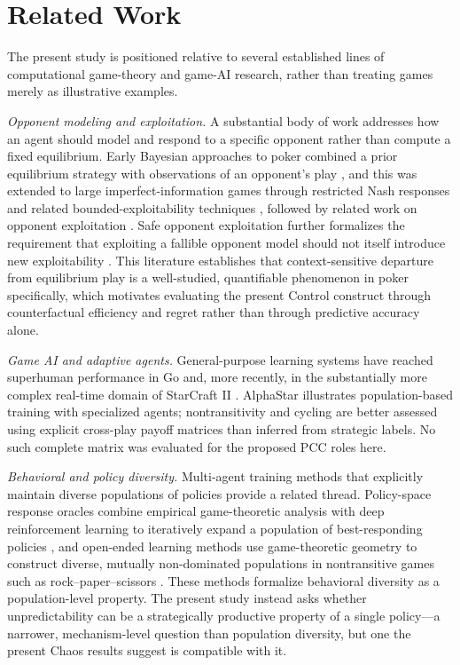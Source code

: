 \documentclass[journal]{IEEEtran}
\begin{document}
\section{Related Work}
\label{sec:related}

The present study is positioned relative to several established lines of computational game-theory and game-AI research, rather than treating games merely as illustrative examples.

\textit{Opponent modeling and exploitation.} A substantial body of work addresses how an agent should model and respond to a specific opponent rather than compute a fixed equilibrium. Early Bayesian approaches to poker combined a prior equilibrium strategy with observations of an opponent's play \cite{southey2005}, and this was extended to large imperfect-information games through restricted Nash responses and related bounded-exploitability techniques \cite{johanson2007}, followed by related work on opponent exploitation \cite{ganzfried2011}. Safe opponent exploitation further formalizes the requirement that exploiting a fallible opponent model should not itself introduce new exploitability \cite{ganzfried2015}. This literature establishes that context-sensitive departure from equilibrium play is a well-studied, quantifiable phenomenon in poker specifically, which motivates evaluating the present Control construct through counterfactual efficiency and regret rather than through predictive accuracy alone.

\textit{Game AI and adaptive agents.} General-purpose learning systems have reached superhuman performance in Go \cite{silver2016} and, more recently, in the substantially more complex real-time domain of StarCraft II \cite{vinyals2019}. AlphaStar illustrates population-based training with specialized agents; nontransitivity and cycling are better assessed using explicit cross-play payoff matrices than inferred from strategic labels. No such complete matrix was evaluated for the proposed PCC roles here.

\textit{Behavioral and policy diversity.} Multi-agent training methods that explicitly maintain diverse populations of policies provide a related thread. Policy-space response oracles combine empirical game-theoretic analysis with deep reinforcement learning to iteratively expand a population of best-responding policies \cite{lanctot2017}, and open-ended learning methods use game-theoretic geometry to construct diverse, mutually non-dominated populations in nontransitive games such as rock--paper--scissors \cite{balduzzi2019}. These methods formalize behavioral diversity as a population-level property. The present study instead asks whether unpredictability can be a strategically productive property of a single policy---a narrower, mechanism-level question than population diversity, but one the present Chaos results suggest is compatible with it.
\end{document}
